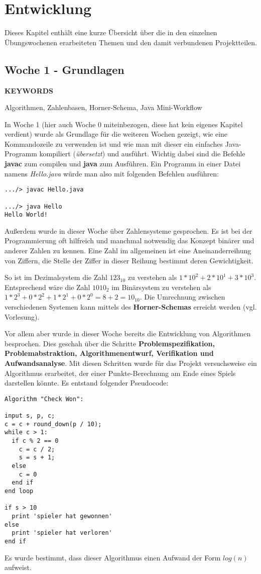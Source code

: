 \section{Entwicklung}
\label{ch:timeline}
Dieses Kapitel enthält eine kurze Übersicht über die in den einzelnen Übungswochenen erarbeiteten Themen und den damit verbundenen Projektteilen. 
\subsection{Woche 1 - Grundlagen}
\label{ch:weekone}
\line
\begin{center}
	\textbf{KEYWORDS}
	
	 Algorithmen, Zahlenbasen, Horner-Schema, Java Mini-Workflow
\end{center}
\line

In Woche 1 (hier auch Woche 0 miteinbezogen, diese hat kein eigenes Kapitel verdient) wurde als Grundlage für die weiteren Wochen gezeigt, wie eine Kommandozeile zu verwenden ist und wie man mit dieser ein einfaches Java-Programm kompiliert (\textit{übersetzt}) und ausführt. Wichtig dabei sind die Befehle \textbf{javac} zum compilen und \textbf{java} zum Ausführen. Ein Programm in einer Datei namens \textit{Hello.java} würde man also mit folgenden Befehlen ausführen:
\begin{verbatim}
.../> javac Hello.java

.../> java Hello
Hello World!
\end{verbatim}
Außerdem wurde in dieser Woche über Zahlensysteme gesprochen. Es ist bei der Programmierung oft hilfreich und manchmal notwendig das Konzept binärer und anderer Zahlen zu kennen. Eine Zahl im allgemeinen ist eine Aneinanderreihung von Ziffern, die Stelle der Ziffer in dieser Reihung bestimmt deren Gewichtigkeit. 

So ist im Dezimalsystem die Zahl $123_{10}$ zu verstehen als $1 * 10^2 + 2 * 10^1 + 3 * 10^3$. Entsprechend wäre die Zahl $1010_{2}$ im Binärsystem zu verstehen als $1 * 2^3 + 0 * 2^2 + 1 * 2^1 + 0*2^0 = 8 + 2 = 10_{10}$. Die Umrechnung zwischen verschiedenen Systemen kann mittels des \textbf{Horner-Schemas} erreicht werden (vgl. Vorlesung).

Vor allem aber wurde in dieser Woche bereits die Entwicklung von Algorithmen besprochen. Dies geschah über die Schritte \textbf{Problemspezifikation, Problemabstraktion, Algorithmenentwurf, Verifikation und Aufwandsanalyse}. Mit diesen Schritten wurde für das Projekt versuchsweise ein Algorithmus erarbeitet, der einer Punkte-Berechnung am Ende eines Spiels darstellen könnte.
Es entstand folgender Pseudocode:
\pagebreak
\begin{verbatim}
Algorithm "Check Won":

input s, p, c;
c = c + round_down(p / 10);
while c > 1:
  if c % 2 == 0
    c = c / 2;
    s = s + 1;
  else
    c = 0
  end if
end loop

if s > 10
  print 'spieler hat gewonnen'
else
  print 'spieler hat verloren'
end if
\end{verbatim}
Es wurde bestimmt, dass dieser Algorithmus einen Aufwand der Form $log(n)$ aufweist.

